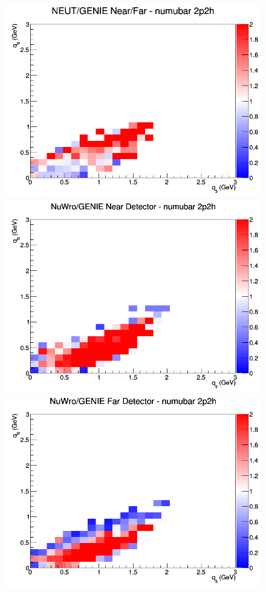 \begin{figure}[h]
\endminipage
{}
\includegraphics[width=\linewidth]{eff_q0_q3/GAr/ratios/2p2h_NEUT_GENIE_numubar_NF_q3_q0.png}
\endminipage
\newline
{}
\includegraphics[width=\linewidth]{eff_q0_q3/GAr/ratios/2p2h_NuWro_GENIE_numubar_near_q3_q0.png}
\endminipage
{}
\includegraphics[width=\linewidth]{eff_q0_q3/GAr/ratios/2p2h_NuWro_GENIE_numubar_far_q3_q0.png}

\end{figure}
